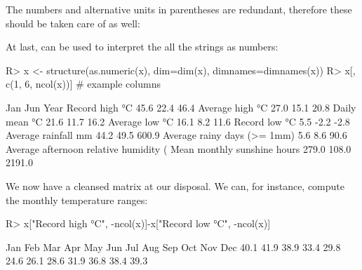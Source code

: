 \documentclass[nojss]{jss}
\begin{document}
The numbers and alternative units in parentheses are redundant,
therefore these should be taken care of as well:

\begin{Schunk}
\end{Schunk}

At last,  can be used to interpret the all the strings
as numbers:

\begin{Schunk}
\begin{Sinput}
R> x <- structure(as.numeric(x), dim=dim(x), dimnames=dimnames(x))
R> x[, c(1, 6, ncol(x))]  # example columns
\end{Sinput}
\begin{Soutput}
                                          Jan   Jun   Year
Record high °C                           45.6  22.4   46.4
Average high °C                          27.0  15.1   20.8
Daily mean °C                            21.6  11.7   16.2
Average low °C                           16.1   8.2   11.6
Record low °C                             5.5  -2.2   -2.8
Average rainfall mm                      44.2  49.5  600.9
Average rainy days (>= 1mm)               5.6   8.6   90.6
Average afternoon relative humidity (%)  47.0  61.0   51.0
Mean monthly sunshine hours             279.0 108.0 2191.0
\end{Soutput}
\end{Schunk}

We now have a cleansed matrix at our disposal.
We can, for instance, compute the monthly temperature ranges:

\begin{Schunk}
\begin{Sinput}
R> x["Record high °C", -ncol(x)]-x["Record low °C", -ncol(x)]
\end{Sinput}
\begin{Soutput}
 Jan  Feb  Mar  Apr  May  Jun  Jul  Aug  Sep  Oct  Nov  Dec
40.1 41.9 38.9 33.4 29.8 24.6 26.1 28.6 31.9 36.8 38.4 39.3
\end{Soutput}
\end{Schunk}
\end{document}

